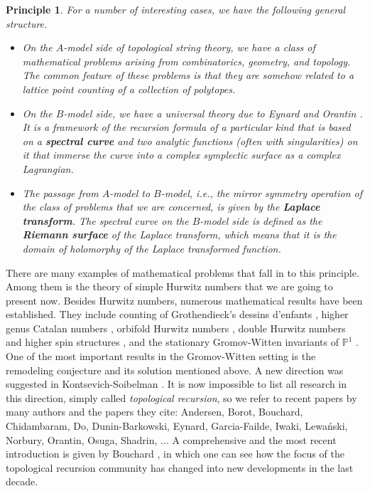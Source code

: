 \documentclass{amsart}
\newtheorem{prin}[thm]{Principle}
\theoremstyle{definition}
\numberwithin{equation}{section}
\numberwithin{figure}{section}
\newcommand{\bP}{{\mathbb{P}}}
\begin{document}
\begin{prin}
\label{prin}
For a number of interesting
cases, we have  the following general structure.
\begin{itemize}
\item
On the   $A$-model side of  topological string
theory, we have a class of mathematical problems
arising from combinatorics, geometry, and topology. 
The common feature of these problems is that they
are somehow related to a lattice point counting
of a collection of polytopes.
\item
On the $B$-model side, we have a universal theory
due to Eynard and Orantin \cite{EO1}. It is a
framework of the recursion formula of a particular
kind that is based on a \textbf{spectral curve} and
 two analytic  functions (often with singularities) on it that
immerse  the curve
into a complex symplectic surface as a complex Lagrangian.
\item
The  passage from  $A$-model
to  $B$-model, i.e., the mirror symmetry operation
of the class of problems that we are concerned,
is given by the \textbf{Laplace transform}.  The
spectral curve on the $B$-model side is
defined  as the \textbf{Riemann surface}
of the Laplace transform, which means that it is the
domain of holomorphy of the Laplace transformed
function.
\end{itemize}
\end{prin}


There are many examples of 
mathematical
problems that fall in to this principle.
Among them is the theory of simple
Hurwitz numbers \cite{EMS,MZ} that we are going to present now. 
Besides Hurwitz numbers, numerous mathematical results have been 
established. They include
counting of Grothendieck's dessins d'enfants
\cite{CMS, MP2012, N1,NS1},
higher genus Catalan numbers \cite{OM4,DMSS},  
orbifold Hurwitz numbers \cite{BHLM}, double Hurwitz numbers
and higher spin structures \cite{MSS},
and the stationary Gromov-Witten invariants of $\bP^1$
\cite{DMNPS, NS2}. One of the most important results in 
the Gromov-Witten setting is 
the  remodeling conjecture 
\cite{BKMP} 
and its solution \cite{FLZ} mentioned above.
A new direction was suggested in Kontsevich-Soibelman \cite{KS2017}.
It is now impossible to list all research in this direction,
simply called \emph{topological recursion},
so we refer to recent papers by many
authors and the papers they cite: Andersen, Borot, Bouchard, Chidambaram,
Do, Dunin-Barkowski, Eynard, 
Garcia-Failde, Iwaki,
Lewa\'nski, Norbury, Orantin, Osuga, Shadrin, ...  A comprehensive
and the most recent
introduction is given by Bouchard \cite{B2024}, in which one can see
how the focus of the topological recursion community has changed into
new developments in the last decade. 
\end{document}
